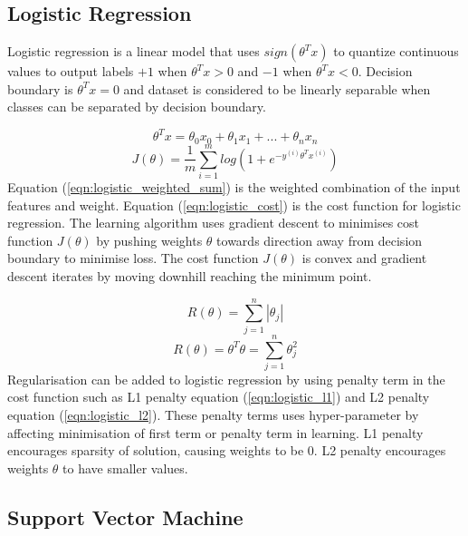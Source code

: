 \documentclass[transmag]{IEEEtran}
\begin{document}
\subsection{Logistic Regression}
\noindent Logistic regression is a linear model that uses $sign(\theta^Tx)$ to quantize continuous values to output labels $+1$ when $\theta^Tx > 0$ and $-1$ when $\theta^Tx < 0$. Decision boundary is $\theta^Tx = 0$ and dataset is considered to be linearly separable when classes can be separated by decision boundary. 

\begin{equation}
\label{eqn:logistic_weighted_sum}
\theta^Tx = \theta_0x_0 + \theta_1x_1 + ... + \theta_nx_n
\end{equation}
\begin{equation}
\label{eqn:logistic_cost}
J(\theta) = \frac{1}{m} \sum^m_{i=1} log (1 + e^{-y^{(i)}\theta^Tx^{(i)}})
\end{equation}
\noindent Equation (\ref{eqn:logistic_weighted_sum}) is the weighted combination of the input features and weight. Equation (\ref{eqn:logistic_cost}) is the cost function for logistic regression. The learning algorithm uses gradient descent to minimises cost function $J(\theta)$ by pushing weights $\theta$ towards direction away from decision boundary to minimise loss. The cost function $J(\theta)$ is convex and gradient descent iterates by moving downhill reaching the minimum point.


\begin{equation}
\label{eqn:logistic_l1}
R(\theta) = \sum^n_{j=1} |\theta_j|
\end{equation}
\begin{equation}
\label{eqn:logistic_l2}
R(\theta) = \theta^T\theta = \sum^n_{j=1}\theta^2_j
\end{equation}
\noindent Regularisation can be added to logistic regression by using penalty term in the cost function such as L1 penalty equation (\ref{eqn:logistic_l1}) and L2 penalty equation (\ref{eqn:logistic_l2}). These penalty terms uses hyper-parameter by affecting minimisation of first term or penalty term in learning. L1 penalty encourages sparsity of solution, causing weights to be 0. L2 penalty encourages weights $\theta$ to have smaller values.


\subsection{Support Vector Machine}
\end{document}
